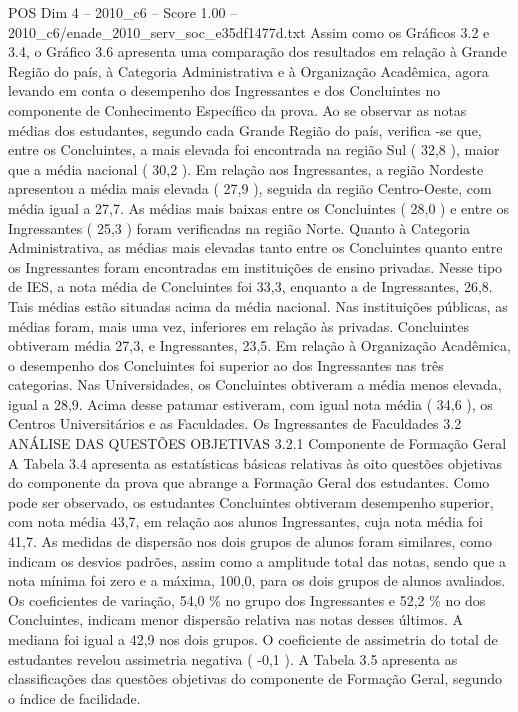 \begin{textsample}{POS Dim 4 – 2010\_c6 – Score 1.00 – 2010\_c6/enade\_2010\_serv\_soc\_e35df1477d.txt}
Assim como os Gráficos 3.2 e 3.4, o Gráfico 3.6 apresenta uma comparação dos resultados em relação à Grande Região do país, à Categoria Administrativa e à Organização Acadêmica, agora levando em conta o desempenho dos Ingressantes e dos Concluintes no componente de Conhecimento Específico da prova.
Ao se observar as notas médias dos estudantes, segundo cada Grande Região do país, verifica -se que, entre os Concluintes, a mais elevada foi encontrada na região Sul ( 32,8 ), maior que a média nacional ( 30,2 ).
Em relação aos Ingressantes, a região Nordeste apresentou a média mais elevada ( 27,9 ), seguida da região Centro-Oeste, com média igual a 27,7.
As médias mais baixas entre os Concluintes ( 28,0 ) e entre os Ingressantes ( 25,3 ) foram verificadas na região Norte.
Quanto à Categoria Administrativa, as médias mais elevadas tanto entre os Concluintes quanto entre os Ingressantes foram encontradas em instituições de ensino privadas.
Nesse tipo de IES, a nota média de Concluintes foi 33,3, enquanto a de Ingressantes, 26,8.
Tais médias estão situadas acima da média nacional.
Nas instituições públicas, as médias foram, mais uma vez, inferiores em relação às privadas.
Concluintes obtiveram média 27,3, e Ingressantes, 23,5.
Em relação à Organização Acadêmica, o desempenho dos Concluintes foi superior ao dos Ingressantes nas três categorias.
Nas Universidades, os Concluintes obtiveram a média menos elevada, igual a 28,9.
Acima desse patamar estiveram, com igual nota média ( 34,6 ), os Centros Universitários e as Faculdades.
Os Ingressantes de Faculdades 3.2 ANÁLISE DAS QUESTÕES OBJETIVAS 3.2.1 Componente de Formação Geral A Tabela 3.4 apresenta as estatísticas básicas relativas às oito questões objetivas do componente da prova que abrange a Formação Geral dos estudantes.
Como pode ser observado, os estudantes Concluintes obtiveram desempenho superior, com nota média 43,7, em relação aos alunos Ingressantes, cuja nota média foi 41,7.
As medidas de dispersão nos dois grupos de alunos foram similares, como indicam os desvios padrões, assim como a amplitude total das notas, sendo que a nota mínima foi zero e a máxima, 100,0, para os dois grupos de alunos avaliados.
Os coeficientes de variação, 54,0 \% no grupo dos Ingressantes e 52,2 \% no dos Concluintes, indicam menor dispersão relativa nas notas desses últimos.
A mediana foi igual a 42,9 nos dois grupos.
O coeficiente de assimetria do total de estudantes revelou assimetria negativa ( -0,1 ).
A Tabela 3.5 apresenta as classificações das questões objetivas do componente de Formação Geral, segundo o índice de facilidade.

\end{textsample}
